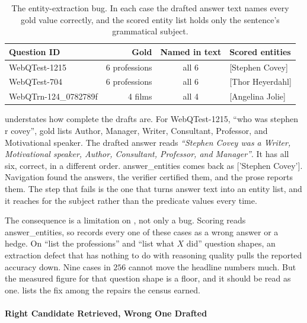 \begin{table}[!tb]
  \begin{center}
    \caption[The entity-extraction bug]{The entity-extraction bug. In each case
    the drafted answer text names every gold value correctly, and the scored
    entity list holds only the sentence's grammatical subject.}
    \label{tab:extraction}
    \small
    \begin{tabular}{|l|r|c|l|}
      \hline
      \textbf{Question ID} & \textbf{Gold} & \textbf{Named in text} &
      \textbf{Scored entities} \\
      \hline
      WebQTest-1215 & 6 professions & all 6 & \textsf{[Stephen Covey]} \\
      WebQTest-704  & 6 professions & all 6 & \textsf{[Thor Heyerdahl]} \\
      WebQTrn-124\_0782789f   & 4 films       & all 4 & \textsf{[Angelina
        Jolie]} \\
      \hline
    \end{tabular}
  \end{center}
\end{table}

 understates how complete the drafts are. For
\textsf{WebQTest-1215}, ``who was stephen r covey'', gold lists Author, Manager,
Writer, Consultant, Professor, and Motivational speaker. The drafted answer
reads \emph{``Stephen Covey was a Writer, Motivational speaker, Author,
Consultant, Professor, and Manager''}. It has all six, correct, in a different
order. \textsf{answer\_entities} comes back as \textsf{['Stephen Covey']}.
Navigation found the answers, the verifier certified them, and the prose reports
them. The step that fails is the one that turns answer text into an entity list,
and it reaches for the subject rather than the predicate values every time.

The consequence is a limitation on , not only a bug. Scoring
reads \textsf{answer\_entities}, so  records every one of these
cases as a wrong answer or a hedge. On ``list the professions'' and ``list what
$X$ did'' question shapes, an extraction defect that has nothing to do with
reasoning quality pulls the reported accuracy down. Nine cases in $256$ cannot
move the headline numbers much. But the measured figure for that question shape
is a floor, and it should be read as one.  lists the fix among
the repairs the census earned.

\paragraph{Right Candidate Retrieved, Wrong One
Drafted}\label{sec:answer-selection}

